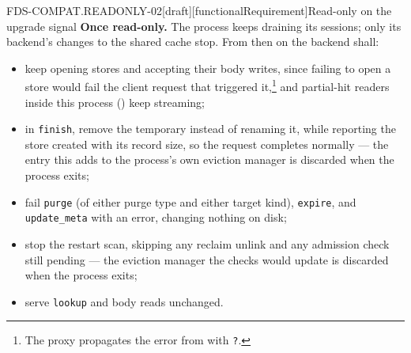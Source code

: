 \begin{requirement}{FDS-COMPAT.READONLY-02}[draft][functionalRequirement]{Read-only on the upgrade signal}
  \textbf{Once read-only.} The process keeps draining its sessions; only its
  backend's changes to the shared cache stop. From then on the backend
  shall:
  \begin{itemize}
    \item keep opening stores and accepting their body writes, since failing
      to open a store would fail the client request that triggered
      it,\footnote{The proxy propagates the error from
      with \texttt{?}.} and partial-hit readers inside this process
      () keep streaming;
    \item in \texttt{finish}, remove the temporary instead of renaming it,
      while reporting the store created with its record size, so the request
      completes normally --- the entry this adds to the process's own
      eviction manager is discarded when the process exits;
    \item fail \texttt{purge} (of either purge type and either target kind),
      \texttt{expire}, and \texttt{update\_meta} with an error, changing nothing
      on disk;
    \item stop the restart scan, skipping any reclaim unlink and any
      admission check still pending --- the eviction manager the checks would
      update is discarded when the process exits;
    \item serve \texttt{lookup} and body reads unchanged.
  \end{itemize}


\end{requirement}
